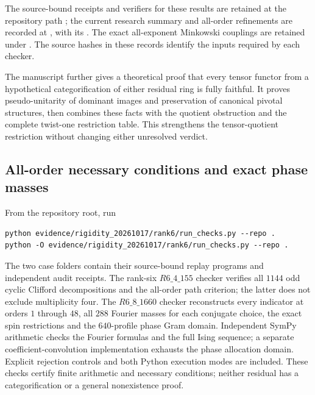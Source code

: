\documentclass[11pt]{article}
\begin{document}
The source-bound receipts and verifiers for these results are retained
at the repository path
;
the current research summary and all-order refinements are recorded at
, with its
.
The exact all-exponent Minkowski couplings are retained under
.
The source hashes in these records identify the inputs required by each
checker.

The manuscript further gives a theoretical proof that every tensor
functor from a hypothetical categorification of either residual ring
is fully faithful. It proves pseudo-unitarity of dominant images and
preservation of canonical pivotal structures, then combines these
facts with the quotient obstruction and the complete twist-one
restriction table. This strengthens the tensor-quotient restriction
without changing either unresolved verdict.

\subsection{All-order necessary conditions and exact phase masses}
From the repository root, run
\begin{verbatim}
python evidence/rigidity_20261017/rank6/run_checks.py --repo .
python -O evidence/rigidity_20261017/rank6/run_checks.py --repo .
\end{verbatim}
The two case folders contain their source-bound replay programs and
independent audit receipts. The rank-six $R6\_4\_155$ checker verifies
all $1144$ odd cyclic Clifford decompositions and the all-order path
criterion; the latter does not exclude multiplicity four. The
$R6\_8\_1660$ checker reconstructs every indicator at orders $1$ through
$48$, all $288$ Fourier masses for each conjugate choice, the exact
spin restrictions and the $640$-profile phase Gram domain. Independent
SymPy arithmetic checks the Fourier formulas and the full Ising sequence;
a separate coefficient-convolution implementation exhausts the phase
allocation domain. Explicit rejection controls and both Python execution
modes are included. These checks certify finite arithmetic and necessary
conditions; neither residual has a categorification or a general
nonexistence proof.
\end{document}
